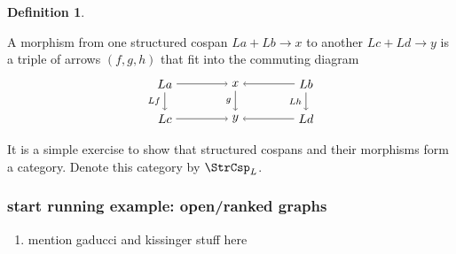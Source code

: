 \documentclass{amsart}
\newcommand{\csp}[3]{#1 + #3 \to #2}
\theoremstyle{remark}
\theoremstyle{definition}
\newtheorem{definition}[theorem]{Definition}
\begin{document}
\begin{definition} \label{df:morph-of-strcsp}

  A morphism from one structured cospan
  \(
    \csp{La}{x}{Lb}
  \)
  to another
  \(
    \csp{Lc}{y}{Ld}
  \)
  is a triple of arrows $ ( f,g,h ) $ that fit into the commuting
  diagram
  \[
    \begin{tikzpicture}
      \node (1) at (-2,1) {\( La \)};
      \node (2) at (0,1) {\( x \)};
      \node (3) at (2,1) {\( Lb \)};
      \node (4) at (-2,0) {\( Lc \)};
      \node (5) at (0,0) {\( y \)};
      \node (6) at (2,0) {\( Ld \)};
      \draw [->] (1) to node [above] {\scriptsize{\(  \)}} (2);
      \draw [->] (3) to node [above] {\scriptsize{\(  \)}} (2);
      \draw [->] (4) to node [below] {\scriptsize{\(  \)}} (5);
      \draw [->] (6) to node [below] {\scriptsize{\(  \)}} (5);
      \draw [->] (1) to node [left] {\scriptsize{\( Lf \)}} (4);
      \draw [->] (2) to node [left] {\scriptsize{\( g \)}} (5);
      \draw [->] (3) to node [left] {\scriptsize{\( Lh \)}} (6);
    \end{tikzpicture}
  \]
\end{definition}

It is a simple exercise to show that structured cospans and their
morphisms form a category.  Denote this category by $ \StrCsp_L
$. 

\subsubsection{start running example: open/ranked graphs}
\label{sec-2-2-3}

\begin{enumerate}
\item mention gaducci and kissinger stuff here
\label{sec-2-2-3-1}
\end{enumerate}
\end{document}

